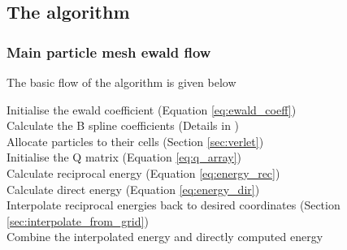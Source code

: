 \documentclass[pdftex,twoside,a4paper]{report}
\begin{document}
\subsection{The algorithm}
\subsubsection{Main particle mesh ewald flow}
The basic flow of the algorithm is given below\\ \newline
\begin{algorithm}[H]
\SetLine
{}
Initialise the ewald coefficient (Equation \ref{eq:ewald_coeff})\\
Calculate the B spline coefficients (Details in \cite{essmann:8577} \cite{lee05})\\
Allocate particles to their cells (Section \ref{sec:verlet})\\
Initialise the Q matrix (Equation \ref{eq:q_array})\\
Calculate reciprocal energy (Equation \ref{eq:energy_rec})\\
Calculate direct energy (Equation \ref{eq:energy_dir})\\
Interpolate reciprocal energies back to desired coordinates (Section \ref{sec:interpolate_from_grid})\\
Combine the interpolated energy and directly computed energy
\end{algorithm}
\end{document}
